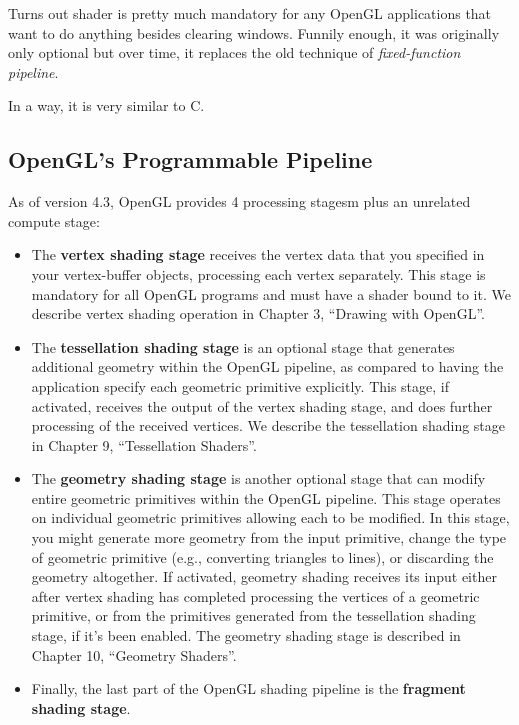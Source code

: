 \documentclass[a4paper, 12pt]{article}
\begin{document}
Turns out shader is pretty much mandatory for any OpenGL applications that want to do anything besides clearing windows.
Funnily enough, it was originally only optional but over time, it replaces the old technique of \textit{fixed-function pipeline}.

In a way, it is very similar to C.

\subsection{OpenGL's Programmable Pipeline}

As of version 4.3, OpenGL provides 4 processing stagesm plus an unrelated compute stage:

\begin{itemize}
      \item
            The \textbf{vertex shading stage} receives the vertex data that you specified in your vertex-buffer objects, processing each vertex separately.
            This stage is mandatory for all OpenGL programs and must have a shader bound to it.
            We describe vertex shading operation in Chapter 3, ``Drawing with OpenGL''.
      \item
            The \textbf{tessellation shading stage} is an optional stage that generates additional geometry within the OpenGL pipeline, as compared to having the application specify each geometric primitive explicitly.
            This stage, if activated, receives the output of the vertex shading stage, and does further processing of the received vertices.
            We describe the tessellation shading stage in Chapter 9, ``Tessellation Shaders''.
      \item
            The \textbf{geometry shading stage} is another optional stage that can modify entire geometric primitives within the OpenGL pipeline.
            This stage operates on individual geometric primitives allowing each to be modified.
            In this stage, you might generate more geometry from the input primitive, change the type of geometric primitive (e.g., converting triangles to lines), or discarding the geometry altogether.
            If activated, geometry shading receives its input either after vertex shading has completed processing the vertices of a geometric primitive, or from the primitives generated from the tessellation shading stage, if it's been enabled.
            The geometry shading stage is described in Chapter 10, ``Geometry Shaders''.
      \item
            Finally, the last part of the OpenGL shading pipeline is the \textbf{fragment shading stage}.

\end{itemize}
\end{document}
